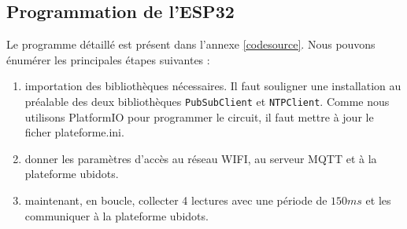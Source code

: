 \subsection{Programmation de l'ESP32}
Le programme détaillé est présent dans l'annexe \ref{codesource}. Nous pouvons énumérer les principales étapes suivantes :
\begin{enumerate}
  \item importation des bibliothèques nécessaires. Il faut souligner une installation au préalable des deux bibliothèques \texttt{PubSubClient} et \texttt{NTPClient}. Comme nous utilisons PlatformIO pour programmer le circuit, il faut mettre à jour le ficher plateforme.ini.
  \item donner les paramètres d'accès au réseau WIFI, au serveur MQTT et à la plateforme ubidots.
  \item maintenant, en boucle, collecter 4 lectures avec une période de $150 ms$ et les communiquer à la plateforme ubidots.
\end{enumerate} 